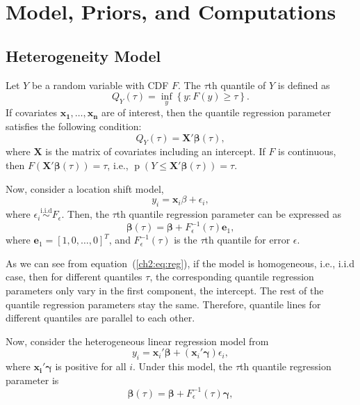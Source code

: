 \documentclass[12pt]{article}
\DeclareMathOperator{\pr}{p}
\begin{document}
\section{Model, Priors, and Computations}
\label{ch2:sec:model}
\subsection{Heterogeneity Model}
Let $Y$ be a random variable with CDF $F$.  The $\tau$th quantile of
$Y$ is defined as
\begin{displaymath}
  Q_Y(\tau) = \underset{y}{\inf} \left\{ y: F(y) \ge \tau \right\}.
\end{displaymath}
If covariates $\bm{x_1, \ldots, x_n}$ are of interest, then the
quantile regression parameter satisfies the following condition:
\begin{displaymath}
  Q_Y(\tau) = \bm{X'\beta}(\tau),
\end{displaymath}
where $\bm{X}$ is the matrix of covariates including an intercept.  If
$F$ is continuous, then $F(\bm{X'\beta}(\tau)) = \tau$, i.e., $\pr(Y
\le \bm{X'\beta}(\tau)) = \tau$.

Now, consider a location shift model,
\begin{displaymath}
  y_i = \bm{x}_i\beta + \epsilon_i,
\end{displaymath}
where $\epsilon_i \stackrel{\mbox{i.i.d}}{\sim} F_{\epsilon}$. Then,
the $\tau$th quantile regression parameter can be expressed as
\begin{equation} \label{ch2:eq:reg} \bm{\beta}(\tau) = \bm{\beta} +
  F^{-1}_{\epsilon}(\tau) \bm{e}_1,
\end{equation}
where $\bm{e}_1 = [1, 0, \ldots, 0]^T$, and $F^{-1}_{\epsilon}(\tau)$
is the $\tau$th quantile for error $\epsilon$.

As we can see from equation~(\ref{ch2:eq:reg}), if the model is
homogeneous, i.e., i.i.d case, then for different quantiles $\tau$,
the corresponding quantile regression parameters only vary in the
first component, the intercept. The rest of the quantile regression
parameters stay the same. Therefore, quantile lines for different
quantiles are parallel to each other.

Now, consider the heterogeneous linear regression model from
\citet{he1998}
\begin{equation}\label{ch2:eq:he}
  y_i = \bm{x}_i'\bm{\beta} + (\bm{x}_i'\bm{\gamma}) \epsilon_i,
\end{equation}
where $\bm{x_i'\gamma}$ is positive for all $i$. Under this model, the
$\tau$th quantile regression parameter is
\begin{equation}\label{ch2:eq:quan}
  \bm{\beta}(\tau) = \bm{\beta} + F^{-1}_{\epsilon}(\tau) \bm{\gamma},
\end{equation}
\end{document}
